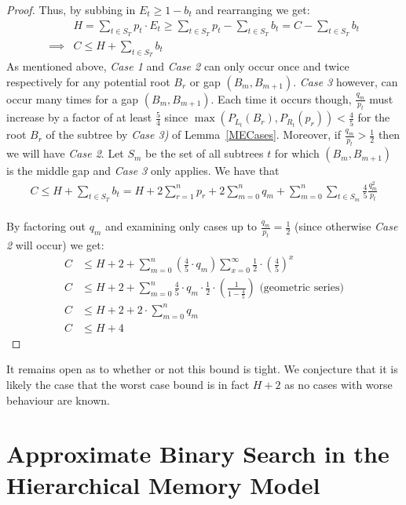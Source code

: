 \documentclass[letterpaper,12pt,titlepage,oneside,final]{book}
\theoremstyle{plain}
\begin{document}
\begin{proof}
\noindent Thus, by subbing in $E_t \geq 1 - b_t$ and rearranging we get: 
\begin{align*}
&H = \sum_{t \in S_T} p_t \cdot E_t \geq \sum_{t \in S_T} p_t - \sum_{t \in S_T} b_t = C - \sum_{t \in S_T} b_t \\
 \implies &C \leq H + \sum_{t \in S_T} b_t
\end{align*}
As mentioned above, \textit{Case 1} and \textit{Case 2} can only occur once and twice respectively for any potential root $B_r$ or gap $(B_m, B_{m+1})$. \textit{Case 3} however, can occur many times for a gap $(B_m, B_{m+1})$. Each time it occurs though, $\frac{q_m}{p_t}$ must increase by a factor of at least $\frac{5}{4}$ since $\max(P_{L_t}(B_r), P_{R_t}(p_r)) < \frac{4}{5}$ for the root $B_r$ of the subtree by \textit{Case 3)} of Lemma~\ref{MECases}. Moreover, if $\frac{q_m}{p_t} > \frac{1}{2}$ then we will have \textit{Case 2}. Let $S_m$ be the set of all subtrees $t$ for which $(B_m, B_{m+1})$ is the middle gap and \textit{Case 3} only applies. We have that
\begin{align*}
C \leq H + \sum_{t \in S_T} b_t = H + 2 \sum\limits_{r = 1}^n p_r + 2 \sum\limits_{m = 0}^n q_m + \sum\limits_{m = 0}^n \sum\limits_{t \in S_m} \frac{4}{5}\frac{q_m^2}{p_t}
\end{align*}
 \\ 
By factoring out $q_m$ and examining only cases up to $\frac{q_m}{p_t} = \frac{1}{2}$ (since otherwise \textit{Case 2} will occur) we get:
\begin{align*}
C &\leq H + 2 + \sum\limits_{m = 0}^n (\frac{4}{5} \cdot q_m) \sum\limits_{x=0}^{\infty} \frac{1}{2} \cdot (\frac{4}{5}) ^ x \\
C &\leq H + 2 + \sum\limits_{m = 0}^n \frac{4}{5} \cdot q_m \cdot \frac{1}{2} \cdot (\frac{1}{1-\frac{4}{5}}) \text{    (geometric series)} \\
C &\leq H + 2 + 2\cdot \sum\limits_{m = 0}^n q_m \\
C &\leq H + 4
\end{align*}

\end{proof}

It remains open as to whether or not this bound is tight. We conjecture that it is likely the case that the worst case bound is in fact $H+2$ as no cases with worse behaviour are known.

\chapter{Approximate Binary Search in the Hierarchical Memory Model}\label{Approximate Binary Search in the Hierarchical Memory Model}
 
\end{document}

